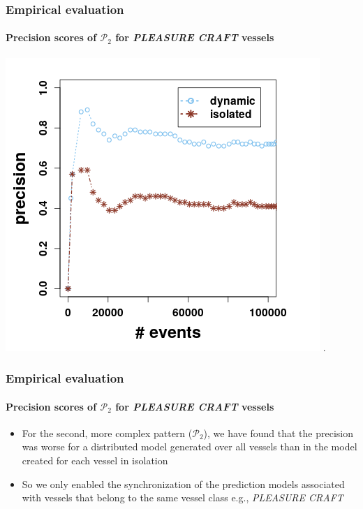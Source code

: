 \begin{frame}
	
	\frametitle{Empirical evaluation }
	\framesubtitle{Precision scores of $\mathcal{P}_2$  for \textit{PLEASURE CRAFT} vessels}
	
	\begin{center}
		\includegraphics[width=.8\textwidth,height=.7\linewidth]{figures/precision_p2.png}
		.
	\end{center}
	
\end{frame}

\begin{frame}
	
	\frametitle{Empirical evaluation }
	\framesubtitle{Precision scores of $\mathcal{P}_2$  for \textit{PLEASURE CRAFT} vessels}
	
	\begin{itemize}
	\item<1-> For the second, more complex pattern ($\mathcal{P}_2$), we have found that the precision was worse for a distributed model generated over all vessels than in the model created for each vessel in isolation
	
\item<1-> 	So we only enabled the synchronization of the prediction models associated with vessels that belong to the same vessel class e.g., \textit{PLEASURE CRAFT}
	
\end{itemize}
	
\end{frame}

